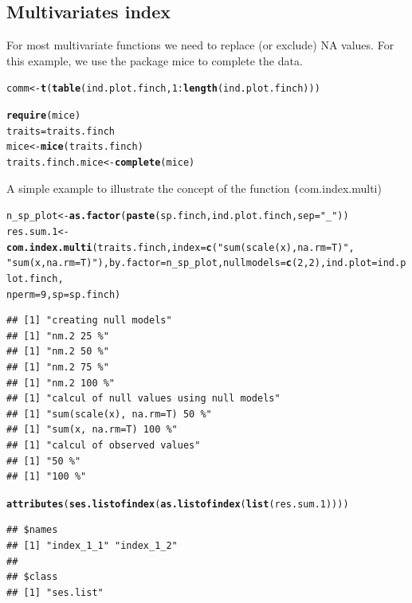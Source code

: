 \documentclass[12pt]{article}\usepackage[]{graphicx}\usepackage[]{color}
\makeatletter
\newcommand{\hlnum}[1]{\textcolor[rgb]{0.686,0.059,0.569}{#1}}%
\newcommand{\hlstr}[1]{\textcolor[rgb]{0.192,0.494,0.8}{#1}}%
\newcommand{\hlopt}[1]{\textcolor[rgb]{0,0,0}{#1}}%
\newcommand{\hlstd}[1]{\textcolor[rgb]{0.345,0.345,0.345}{#1}}%
\newcommand{\hlkwb}[1]{\textcolor[rgb]{0.69,0.353,0.396}{#1}}%
\newcommand{\hlkwc}[1]{\textcolor[rgb]{0.333,0.667,0.333}{#1}}%
\newcommand{\hlkwd}[1]{\textcolor[rgb]{0.737,0.353,0.396}{\textbf{#1}}}%
\newenvironment{kframe}{%
 \def\at@end@of@kframe{}%
 \ifinner\ifhmode%
  \def\at@end@of@kframe{\end{minipage}}%
  \begin{minipage}{\columnwidth}%
 \fi\fi%
 \def\FrameCommand##1{\hskip\@totalleftmargin \hskip-\fboxsep
 \colorbox{shadecolor}{##1}\hskip-\fboxsep
     \hskip-\linewidth \hskip-\@totalleftmargin \hskip\columnwidth}%
 \MakeFramed {\advance\hsize-\width
   \@totalleftmargin\z@ \linewidth\hsize
   \@setminipage}}%
 {\par\unskip\endMakeFramed%
 \at@end@of@kframe}
\newenvironment{knitrout}{}{} %
\newcommand{\code}[1]{{{\tt #1}}}
\makeatother
\begin{document}
\newpage

\subsection{Multivariates index}

For most multivariate functions we need to replace (or exclude) NA values. For this example, we use the package mice to complete the data.

\begin{knitrout}
\color{fgcolor}\begin{kframe}
\begin{alltt}
\hlstd{comm} \hlkwb{<-} \hlkwd{t}\hlstd{(}\hlkwd{table}\hlstd{(ind.plot.finch,} \hlnum{1}\hlopt{:}\hlkwd{length}\hlstd{(ind.plot.finch)))}

\hlkwd{require}\hlstd{(mice)}
\hlstd{traits} \hlkwb{=} \hlstd{traits.finch}
\hlstd{mice} \hlkwb{<-} \hlkwd{mice}\hlstd{(traits.finch)}
\hlstd{traits.finch.mice} \hlkwb{<-} \hlkwd{complete}\hlstd{(mice)}
\end{alltt}
\end{kframe}
\end{knitrout}


A simple example to illustrate the concept of the function \code(com.index.multi) 

\begin{knitrout}
\color{fgcolor}\begin{kframe}
\begin{alltt}
\hlstd{n_sp_plot} \hlkwb{<-} \hlkwd{as.factor}\hlstd{(}\hlkwd{paste}\hlstd{(sp.finch, ind.plot.finch,} \hlkwc{sep} \hlstd{=} \hlstr{"_"}\hlstd{))}
\hlstd{res.sum.1} \hlkwb{<-} \hlkwd{com.index.multi}\hlstd{(traits.finch,} \hlkwc{index} \hlstd{=} \hlkwd{c}\hlstd{(}\hlstr{"sum(scale(x), na.rm=T)"}\hlstd{,}
    \hlstr{"sum(x, na.rm=T)"}\hlstd{),} \hlkwc{by.factor} \hlstd{= n_sp_plot,} \hlkwc{nullmodels} \hlstd{=} \hlkwd{c}\hlstd{(}\hlnum{2}\hlstd{,} \hlnum{2}\hlstd{),} \hlkwc{ind.plot} \hlstd{= ind.plot.finch,}
    \hlkwc{nperm} \hlstd{=} \hlnum{9}\hlstd{,} \hlkwc{sp} \hlstd{= sp.finch)}
\end{alltt}
\begin{verbatim}
## [1] "creating null models"
## [1] "nm.2 25 %"
## [1] "nm.2 50 %"
## [1] "nm.2 75 %"
## [1] "nm.2 100 %"
## [1] "calcul of null values using null models"
## [1] "sum(scale(x), na.rm=T) 50 %"
## [1] "sum(x, na.rm=T) 100 %"
## [1] "calcul of observed values"
## [1] "50 %"
## [1] "100 %"
\end{verbatim}
\begin{alltt}
\hlkwd{attributes}\hlstd{(}\hlkwd{ses.listofindex}\hlstd{(}\hlkwd{as.listofindex}\hlstd{(}\hlkwd{list}\hlstd{(res.sum.1))))}
\end{alltt}
\begin{verbatim}
## $names
## [1] "index_1_1" "index_1_2"
## 
## $class
## [1] "ses.list"
\end{verbatim}
\end{kframe}
\end{knitrout}
\end{document}

